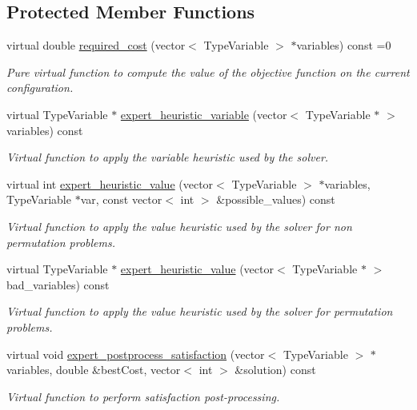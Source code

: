 \subsection*{Protected Member Functions}
\begin{DoxyCompactItemize}
\item 
virtual double \hyperlink{classghost_1_1Objective_ac6baed2eee899efd4c485e5a1e563ee9}{required\-\_\-cost} (vector$<$ Type\-Variable $>$ $\ast$variables) const =0
\begin{DoxyCompactList}\small\item\em Pure virtual function to compute the value of the objective function on the current configuration. \end{DoxyCompactList}\item 
virtual Type\-Variable $\ast$ \hyperlink{classghost_1_1Objective_aac40c6e997bf5e959a934d2972523777}{expert\-\_\-heuristic\-\_\-variable} (vector$<$ Type\-Variable $\ast$ $>$ variables) const 
\begin{DoxyCompactList}\small\item\em Virtual function to apply the variable heuristic used by the solver. \end{DoxyCompactList}\item 
virtual int \hyperlink{classghost_1_1Objective_a98fa914f81c931e804a54303f18bf443}{expert\-\_\-heuristic\-\_\-value} (vector$<$ Type\-Variable $>$ $\ast$variables, Type\-Variable $\ast$var, const vector$<$ int $>$ \&possible\-\_\-values) const 
\begin{DoxyCompactList}\small\item\em Virtual function to apply the value heuristic used by the solver for non permutation problems. \end{DoxyCompactList}\item 
virtual Type\-Variable $\ast$ \hyperlink{classghost_1_1Objective_a204b2d5bc9eaeefd87befaf6302118dc}{expert\-\_\-heuristic\-\_\-value} (vector$<$ Type\-Variable $\ast$ $>$ bad\-\_\-variables) const 
\begin{DoxyCompactList}\small\item\em Virtual function to apply the value heuristic used by the solver for permutation problems. \end{DoxyCompactList}\item 
virtual void \hyperlink{classghost_1_1Objective_ad0ea35956c02314029baebe4ffc4cfa2}{expert\-\_\-postprocess\-\_\-satisfaction} (vector$<$ Type\-Variable $>$ $\ast$variables, double \&best\-Cost, vector$<$ int $>$ \&solution) const 
\begin{DoxyCompactList}\small\item\em Virtual function to perform satisfaction post-\/processing. \end{DoxyCompactList}\item 

\end{DoxyCompactItemize}
